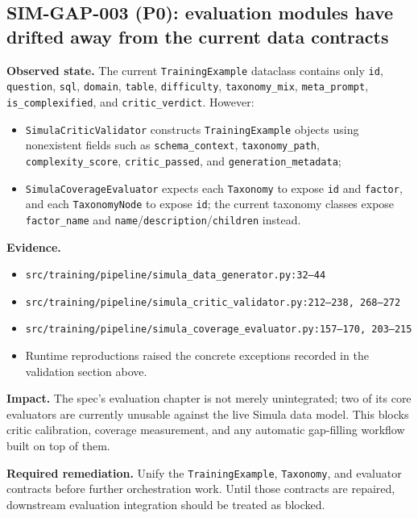 \subsection*{SIM-GAP-003 (P0): evaluation modules have drifted away from the current data contracts}
\textbf{Observed state.}
The current \texttt{TrainingExample} dataclass contains only
\texttt{id}, \texttt{question}, \texttt{sql}, \texttt{domain},
\texttt{table}, \texttt{difficulty}, \texttt{taxonomy\_mix},
\texttt{meta\_prompt}, \texttt{is\_complexified}, and
\texttt{critic\_verdict}. However:
\begin{itemize}
  \item \texttt{SimulaCriticValidator} constructs
    \texttt{TrainingExample} objects using nonexistent fields such as
    \texttt{schema\_context}, \texttt{taxonomy\_path},
    \texttt{complexity\_score}, \texttt{critic\_passed}, and
    \texttt{generation\_metadata};
  \item \texttt{SimulaCoverageEvaluator} expects each
    \texttt{Taxonomy} to expose \texttt{id} and \texttt{factor}, and
    each \texttt{TaxonomyNode} to expose \texttt{id}; the current
    taxonomy classes expose \texttt{factor\_name} and
    \texttt{name}/\texttt{description}/\texttt{children} instead.
\end{itemize}

\textbf{Evidence.}
\begin{itemize}
  \item \texttt{src/training/pipeline/simula\_data\_generator.py:32--44}
  \item \texttt{src/training/pipeline/simula\_critic\_validator.py:212--238, 268--272}
  \item \texttt{src/training/pipeline/simula\_coverage\_evaluator.py:157--170, 203--215}
  \item Runtime reproductions raised the concrete exceptions recorded
    in the validation section above.
\end{itemize}

\textbf{Impact.}
The spec's evaluation chapter is not merely unintegrated; two of its
core evaluators are currently unusable against the live Simula data
model. This blocks critic calibration, coverage measurement, and any
automatic gap-filling workflow built on top of them.

\textbf{Required remediation.}
Unify the \texttt{TrainingExample}, \texttt{Taxonomy}, and evaluator
contracts before further orchestration work. Until those contracts
are repaired, downstream evaluation integration should be treated as
blocked.

